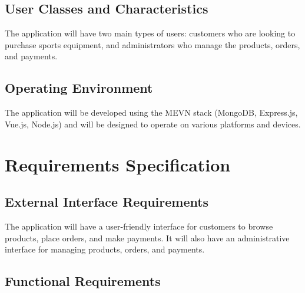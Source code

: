 \subsection{User Classes and Characteristics}
The application will have two main types of users: customers who are looking to purchase sports equipment, and administrators who manage the products, orders, and payments.
\subsection{Operating Environment}
The application will be developed using the MEVN stack (MongoDB, Express.js, Vue.js, Node.js) and will be designed to operate on various platforms and devices.

\section{ Requirements Specification}
\subsection{ External Interface Requirements}

The application will have a user-friendly interface for customers to browse products, place orders, and make payments. It will also have an administrative interface for managing products, orders, and payments.

\subsection{ Functional Requirements}
